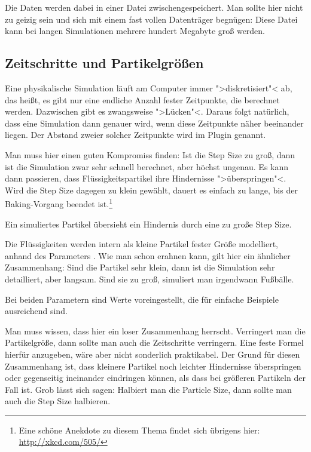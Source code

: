 \documentclass[10pt,DIV=14,a4paper]{scrartcl}
\begin{document}
Die Daten werden dabei in einer Datei zwischengespeichert. Man sollte
hier nicht zu geizig sein und sich mit einem fast vollen Datenträger
begnügen: Diese Datei kann bei langen Simulationen mehrere hundert
Megabyte groß werden.

\subsection{Zeitschritte und Partikelgrößen}
Eine physikalische Simulation läuft am Computer immer ">diskretisiert"<
ab, das heißt, es gibt nur eine endliche Anzahl fester Zeitpunkte, die
berechnet werden. Dazwischen gibt es zwangsweise ">Lücken"<. Daraus
folgt natürlich, dass eine Simulation dann genauer wird, wenn diese
Zeitpunkte näher beeinander liegen. Der Abstand zweier solcher
Zeitpunkte wird im Plugin  genannt.

Man muss hier einen guten Kompromiss finden: Ist die Step Size zu groß,
dann ist die Simulation zwar sehr schnell berechnet, aber höchst
ungenau. Es kann dann passieren, dass Flüssigkeitspartikel ihre
Hindernisse ">überspringen"<. Wird die Step Size dagegen zu klein
gewählt, dauert es einfach zu lange, bis der Baking-Vorgang beendet
ist.\footnote{Eine schöne Anekdote zu diesem Thema findet sich übrigens
hier: \url{http://xkcd.com/505/}}

{Ein simuliertes Partikel übersieht ein Hindernis durch eine zu große
Step Size.}

Die Flüssigkeiten werden intern als kleine Partikel fester Größe
modelliert, anhand des Parameters . Wie man schon
erahnen kann, gilt hier ein ähnlicher Zusammenhang: Sind die Partikel
sehr klein, dann ist die Simulation sehr detailliert, aber langsam. Sind
sie zu groß, simuliert man irgendwann Fußbälle.

Bei beiden Parametern sind Werte voreingestellt, die für einfache
Beispiele ausreichend sind.

Man muss wissen, dass hier ein loser Zusammenhang herrscht. Verringert
man die Partikelgröße, dann sollte man auch die Zeitschritte verringern.
Eine feste Formel hierfür anzugeben, wäre aber nicht sonderlich
praktikabel. Der Grund für diesen Zusammenhang ist, dass kleinere
Partikel noch leichter Hindernisse überspringen oder gegenseitig
ineinander eindringen können, als dass bei größeren Partikeln der Fall
ist. Grob lässt sich sagen: Halbiert man die Particle Size, dann sollte
man auch die Step Size halbieren.
\end{document}
